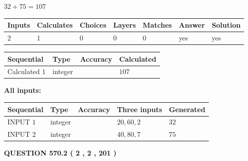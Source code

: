\documentclass[12pt]{article}
\begin{document}
 

$ %
32 +  %
75=   %
107$
 
 
\noindent{}
 
 

 
   
   
   
   
\noindent\begin{tabular}{|l|l|l|l|l|l|l|}
 \hline
Inputs & Calculates & Choices & Layers & Matches & Answer & Solution \\ \hline
 2  & 
 1  & 
 0
  & 
 0  & 
 0  & 
  yes & 
  yes 
  \\ \hline
 \end{tabular}
   
   
   
   
\noindent{}
   
   
  
  
\noindent\begin{tabular}{|l|l|l|l|}
\hline
 Sequential & Type & Accuracy & Calculated \\ 
\hline
 
 
  Calculated $  1 $ & integer &  & 
  $ 107 $ 
 \\  \hline  
 \end{tabular}
   
   
   
   
\noindent\vspace{0.1in}\hspace{-0.08in} {\textbf{\Large{All inputs: }}}
   
   
  
  
\noindent\begin{tabular}{|l|l|l|l|l|}
\hline
 Sequential & Type & Accuracy & Three inputs & Generated \\ 
\hline
 
 
  INPUT $  1 $ & integer &  & $
 20
 , 
 60
 , 
 2
 $ & $ 32 $ 
 \\  \hline  
 
 
  INPUT $  2 $ & integer &  & $
 40
 , 
 80
 , 
 7
 $ & $ 75 $ 
 \\  \hline  
 \end{tabular}
   
   
  
\vspace{0.2in}
  
{\textbf{\Large{QUESTION
570.2 
 ( 2 , 2 , 201 )
}}}
  
\end{document}

